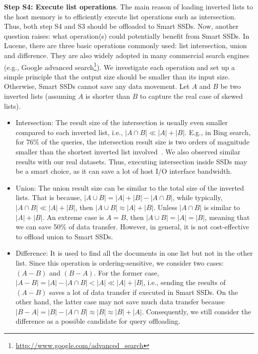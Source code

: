 \textbf{Step S4: Execute list operations}. The main reason of loading inverted lists to the host memory is to efficiently execute list operations such as intersection. Thus, both step S4 and S3 should be offloaded to Smart SSDs. Now, another question raises: what operation(s) could potentially benefit from Smart SSDs. In Lucene, there are three basic operations commonly used: list \textsf{intersection}, \textsf{union} and \textsf{difference}. They are also widely adopted in many commercial search engines (e.g., Google advanced search\footnote{\small\url{http://www.google.com/advanced_search}}). We investigate each operation and set up a simple principle that the output size should be smaller than its input size. Otherwise, Smart SSDs cannot save any data movement. Let $A$ and $B$ be two inverted lists (assuming $A$ is shorter than $B$ to capture the real case of skewed lists).
\begin{itemize}%
  \item \textsf{Intersection}: The result size of the intersection is usually even smaller compared to each inverted list, i.e., $|A\cap B| \ll |A| + |B|$. E.g., in Bing search, for 76\% of the queries, the intersection result size is two orders of magnitude smaller than the shortest inverted list involved~\cite{Ding2011}. We also observed similar results with our real datasets. Thus, executing intersection inside SSDs may be a smart choice, as it can save a lot of host I/O interface bandwidth.

  \item \textsf{Union}: The union result size can be similar to the total size of the inverted lists. That is because, $|A\cup B| = |A| + |B| - |A\cap B|$, while typically, $|A\cap B| \ll |A| + |B|$, then $|A\cup B| \approx |A| + |B|$. Unless $|A\cap B|$ is similar to $|A| + |B|$. An extreme case is $A = B$, then $|A\cup B| = |A| = |B|$, meaning that we can save 50\% of data transfer. However, in general, it is not cost-effective to offload \textsf{union} to Smart SSDs.

  \item \textsf{Difference}: It is used to find all the documents in one list but not in the other list. Since this operation is ordering-sensitive, we consider two cases: $(A - B)$ and $(B - A)$. For the former case, $|A - B| = |A| - |A\cap B| < |A| \ll |A| + |B|$, i.e., sending the results of $(A - B)$ saves a lot of data transfer if executed in Smart SSDs. On the other hand, the latter case may not save much data transfer because $|B - A| = |B| - |A\cap B| \approx |B| \approx |B| + |A|$. Consequently, we still consider the \textsf{difference} as a possible candidate for query offloading.
\end{itemize}

